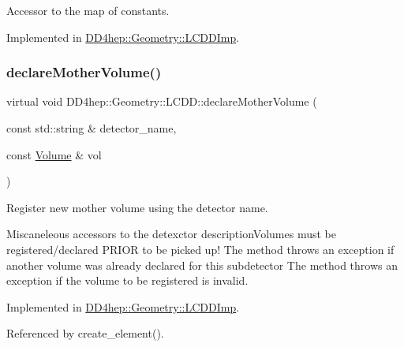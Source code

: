 Accessor to the map of constants. 



Implemented in \hyperlink{class_d_d4hep_1_1_geometry_1_1_l_c_d_d_imp_a4c8db4aeaa5270cdfb467a4ff123edc6}{D\+D4hep\+::\+Geometry\+::\+L\+C\+D\+D\+Imp}.

\hypertarget{class_d_d4hep_1_1_geometry_1_1_l_c_d_d_a6cbadc0074dd9cc3b88b5e0a527586a2}{}\label{class_d_d4hep_1_1_geometry_1_1_l_c_d_d_a6cbadc0074dd9cc3b88b5e0a527586a2} 
\subsubsection{\texorpdfstring{declare\+Mother\+Volume()}{declareMotherVolume()}}
{\footnotesize\ttfamily virtual void D\+D4hep\+::\+Geometry\+::\+L\+C\+D\+D\+::declare\+Mother\+Volume (\begin{DoxyParamCaption}\item[{const std\+::string \&}]{detector\+\_\+name,  }\item[{const \hyperlink{class_d_d4hep_1_1_geometry_1_1_volume}{Volume} \&}]{vol }\end{DoxyParamCaption})\hspace{0.3cm}{\ttfamily [pure virtual]}}



Register new mother volume using the detector name. 

Miscaneleous accessors to the detexctor description\+Volumes must be registered/declared P\+R\+I\+OR to be picked up! The method throws an exception if another volume was already declared for this subdetector The method throws an exception if the volume to be registered is invalid. 

Implemented in \hyperlink{class_d_d4hep_1_1_geometry_1_1_l_c_d_d_imp_ac8faeaaa5f56b48c6306cb3099f84568}{D\+D4hep\+::\+Geometry\+::\+L\+C\+D\+D\+Imp}.



Referenced by create\+\_\+element().

\hypertarget{class_d_d4hep_1_1_geometry_1_1_l_c_d_d_a7470fc11102bacc2b486590de49a8017}{}\label{class_d_d4hep_1_1_geometry_1_1_l_c_d_d_a7470fc11102bacc2b486590de49a8017} 
